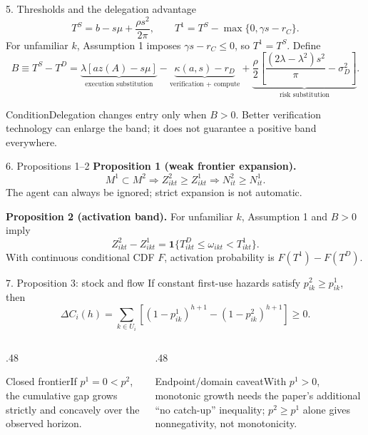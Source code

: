 \documentclass[aspectratio=169,10pt]{beamer}
\begin{document}
\begin{frame}{5. Thresholds and the delegation advantage}
\small
\[
T^S=b-s\mu+\frac{\rho s^2}{2\pi},\qquad
T^1=T^S-\max\{0,\gamma s-r_C\}.
\]
For unfamiliar $k$, Assumption 1 imposes $\gamma s-r_C\le0$, so $T^1=T^S$. Define
\[
B\equiv T^S-T^D
=\underbrace{\lambda[az(A)-s\mu]}_{\text{execution substitution}}
-\underbrace{\kappa(a,s)-r_D}_{\text{verification + compute}}
+\underbrace{\frac{\rho}{2}\left[\frac{(2\lambda-\lambda^2)s^2}{\pi}-\sigma_D^2\right]}_{\text{risk substitution}}.
\]
\begin{alertblock}{Condition}Delegation changes entry only when $B>0$. Better verification technology can enlarge the band; it does not guarantee a positive band everywhere.\end{alertblock}
\end{frame}

\begin{frame}{6. Propositions 1--2}
\textbf{Proposition 1 (weak frontier expansion).}
\[
M^1\subset M^2\Longrightarrow Z^2_{ikt}\ge Z^1_{ikt}\Longrightarrow N^2_{it}\ge N^1_{it}.
\]
The agent can always be ignored; strict expansion is not automatic.
\vspace{.8em}

\textbf{Proposition 2 (activation band).} For unfamiliar $k$, Assumption 1 and $B>0$ imply
\[
\boxed{Z^2_{ikt}-Z^1_{ikt}=\mathbf 1\{T^D_{ikt}\le\omega_{ikt}<T^1_{ikt}\}}.
\]
With continuous conditional CDF $F$, activation probability is $F(T^1)-F(T^D)$.
\end{frame}

\begin{frame}{7. Proposition 3: stock and flow}
If constant first-use hazards satisfy $p^2_{ik}\ge p^1_{ik}$, then
\[
\Delta C_i(h)=\sum_{k\in U_i}\left[(1-p^1_{ik})^{h+1}-(1-p^2_{ik})^{h+1}\right]\ge0.
\]
\begin{columns}[T,onlytextwidth]
\begin{column}{.48\textwidth}\begin{block}{Closed frontier}If $p^1=0<p^2$, the cumulative gap grows strictly and concavely over the observed horizon.\end{block}\end{column}
\begin{column}{.48\textwidth}\begin{alertblock}{Endpoint/domain caveat}With $p^1>0$, monotonic growth needs the paper's additional “no catch-up” inequality; $p^2\ge p^1$ alone gives nonnegativity, not monotonicity.\end{alertblock}\end{column}
\end{columns}
\end{frame}
\end{document}
